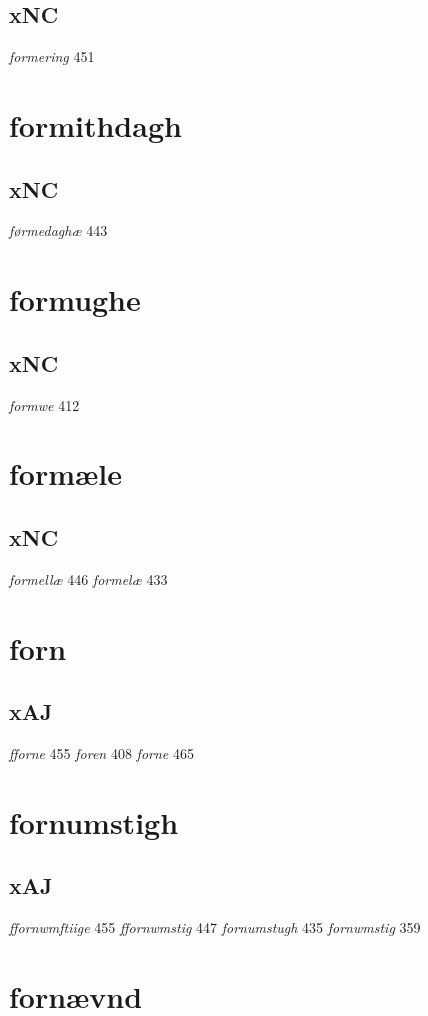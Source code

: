 \documentclass[a4paper,twocolumn]{article}
\begin{document}
\subsection{xNC}
\label{sec:orgcbb5df5}
\emph{formering} 451 
\section{formithdagh}
\label{sec:orge430bd4}
\subsection{xNC}
\label{sec:org3a2c065}
\emph{førmedaghæ} 443 
\section{formughe}
\label{sec:org70b9470}
\subsection{xNC}
\label{sec:org64a6200}
\emph{formwe} 412 
\section{formæle}
\label{sec:orgaf97cdc}
\subsection{xNC}
\label{sec:org5467f5b}
\emph{formellæ} 446 \emph{formelæ} 433 
\section{forn}
\label{sec:org154cded}
\subsection{xAJ}
\label{sec:orgb0cebdc}
\emph{fforne} 455 \emph{foren} 408 \emph{forne} 465 
\section{fornumstigh}
\label{sec:org63ae982}
\subsection{xAJ}
\label{sec:orgd1a10c9}
\emph{ffornwmftiige} 455 \emph{ffornwmstig} 447 \emph{fornumstugh} 435 \emph{fornwmstig} 359 
\section{fornævnd}
\label{sec:orgdf9188e}
\end{document}
